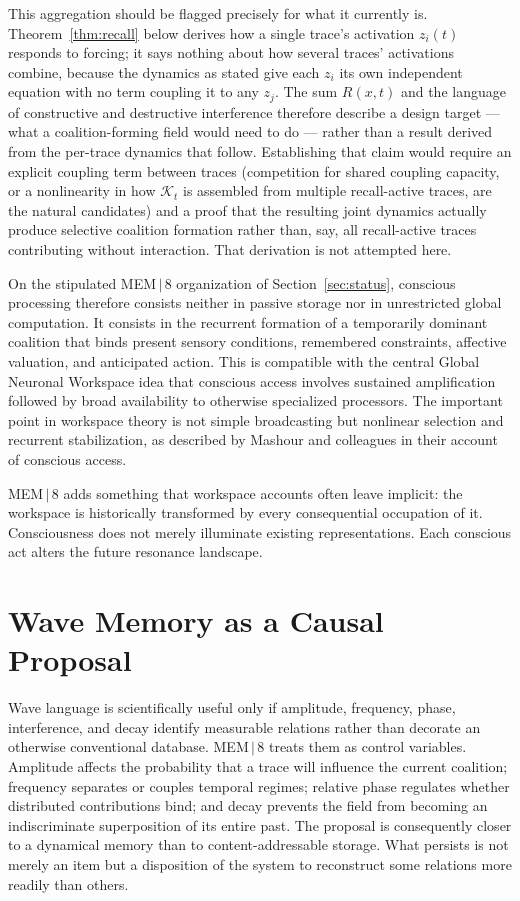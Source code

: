 \documentclass[11pt]{article}
\begin{document}
This aggregation should be flagged precisely for what it currently is. Theorem~\ref{thm:recall} below derives how a single trace's activation $z_i(t)$ responds to forcing; it says nothing about how several traces' activations combine, because the dynamics as stated give each $z_i$ its own independent equation with no term coupling it to any $z_j$. The sum $R(x,t)$ and the language of constructive and destructive interference therefore describe a design target --- what a coalition-forming field would need to do --- rather than a result derived from the per-trace dynamics that follow. Establishing that claim would require an explicit coupling term between traces (competition for shared coupling capacity, or a nonlinearity in how $\mathcal{K}_t$ is assembled from multiple recall-active traces, are the natural candidates) and a proof that the resulting joint dynamics actually produce selective coalition formation rather than, say, all recall-active traces contributing without interaction. That derivation is not attempted here.

On the stipulated MEM\,$|$\,8 organization of Section~\ref{sec:status}, conscious processing therefore consists neither in passive storage nor in unrestricted global computation. It consists in the recurrent formation of a temporarily dominant coalition that binds present sensory conditions, remembered constraints, affective valuation, and anticipated action. This is compatible with the central Global Neuronal Workspace idea that conscious access involves sustained amplification followed by broad availability to otherwise specialized processors. The important point in workspace theory is not simple broadcasting but nonlinear selection and recurrent stabilization, as described by Mashour and colleagues in their account of conscious access.

MEM\,$|$\,8 adds something that workspace accounts often leave implicit: the workspace is historically transformed by every consequential occupation of it. Consciousness does not merely illuminate existing representations. Each conscious act alters the future resonance landscape.

\section{Wave Memory as a Causal Proposal}

Wave language is scientifically useful only if amplitude, frequency, phase, interference, and decay identify measurable relations rather than decorate an otherwise conventional database. MEM\,$|$\,8 treats them as control variables. Amplitude affects the probability that a trace will influence the current coalition; frequency separates or couples temporal regimes; relative phase regulates whether distributed contributions bind; and decay prevents the field from becoming an indiscriminate superposition of its entire past. The proposal is consequently closer to a dynamical memory than to content-addressable storage. What persists is not merely an item but a disposition of the system to reconstruct some relations more readily than others.
\end{document}
